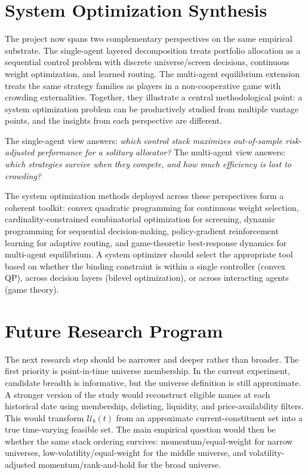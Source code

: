 \documentclass[journal,10pt]{IEEEtran}
\begin{document}
\section{System Optimization Synthesis}
The project now spans two complementary perspectives on the same empirical substrate. The single-agent layered decomposition treats portfolio allocation as a sequential control problem with discrete universe/screen decisions, continuous weight optimization, and learned routing. The multi-agent equilibrium extension treats the same strategy families as players in a non-cooperative game with crowding externalities. Together, they illustrate a central methodological point: a system optimization problem can be productively studied from multiple vantage points, and the insights from each perspective are different.

The single-agent view answers: \textit{which control stack maximizes out-of-sample risk-adjusted performance for a solitary allocator?} The multi-agent view answers: \textit{which strategies survive when they compete, and how much efficiency is lost to crowding?}

The system optimization methods deployed across these perspectives form a coherent toolkit: convex quadratic programming for continuous weight selection, cardinality-constrained combinatorial optimization for screening, dynamic programming for sequential decision-making, policy-gradient reinforcement learning for adaptive routing, and game-theoretic best-response dynamics for multi-agent equilibrium. A system optimizer should select the appropriate tool based on whether the binding constraint is within a single controller (convex QP), across decision layers (bilevel optimization), or across interacting agents (game theory).

\section{Future Research Program}
The next research step should be narrower and deeper rather than broader. The first priority is point-in-time universe membership. In the current experiment, candidate breadth is informative, but the universe definition is still approximate. A stronger version of the study would reconstruct eligible names at each historical date using membership, delisting, liquidity, and price-availability filters. This would transform $\mathcal{U}_b(t)$ from an approximate current-constituent set into a true time-varying feasible set. The main empirical question would then be whether the same stack ordering survives: momentum/equal-weight for narrow universes, low-volatility/equal-weight for the middle universe, and volatility-adjusted momentum/rank-and-hold for the broad universe.
\end{document}
